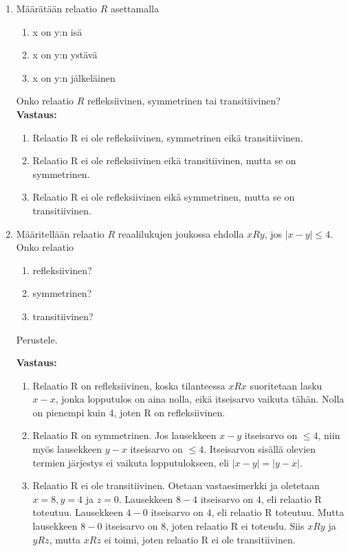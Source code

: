 \documentclass[a4paper,12pt]{article}
\begin{document}
 

\otsikko

\begin{enumerate}
\item Määrätään relaatio $R$ asettamalla 
\begin{enumerate}
    \item x on y:n isä
    \item x on y:n ystävä
    \item x on y:n jälkeläinen
\end{enumerate}
Onko relaatio $R$ refleksiivinen, symmetrinen tai transitiivinen? \\

\textbf{Vastaus:} 
\begin{enumerate}
    \item Relaatio R ei ole refleksiivinen, symmetrinen eikä transitiivinen. 
    \item Relaatio R ei ole refleksiivinen eikä transitiivinen, mutta se on symmetrinen.
    \item Relaatio R ei ole refleksiivinen eikä symmetrinen, mutta se on transitiivinen. 
\end{enumerate}
\vspace{1em}

\item M\"a\"aritell\"a\"an relaatio $R$ reaalilukujen joukossa ehdolla $xRy$, jos $|x-y|\leq 4$. Onko relaatio
\begin{enumerate}
    \item refleksiivinen?
    \item symmetrinen?
    \item transitiivinen?
\end{enumerate}
Perustele.

\textbf{Vastaus:}

\begin{enumerate}
    \item Relaatio R on refleksiivinen, koska tilanteessa $xRx$ suoritetaan lasku $x-x$, jonka lopputulos on aina nolla, eikä itseisarvo vaikuta tähän. Nolla on pienempi kuin 4, joten R on refleksiivinen. 
    \item Relaatio R on symmetrinen. Jos lausekkeen $x-y$ itseisarvo on $\leq4$, niin myös lausekkeen $y-x$ itseisarvo on $\leq 4$. Itseisarvon sisällä olevien termien järjestys ei vaikuta lopputulokseen, eli $|x-y|=|y-x|$. 
    \item Relaatio R ei ole transitiivinen. Otetaan vastaesimerkki ja oletetaan $x=8, y=4$ ja $z=0$. Lausekkeen $8-4$ itseisarvo on $4$, eli relaatio R toteutuu. Lausekkeen $4-0$ itseisarvo on $4$, eli relaatio R toteutuu. Mutta lausekkeen $8-0$ itseisarvo on 8, joten relaatio R ei toteudu. Siis $xRy$ ja $yRz$, mutta $xRz$ ei toimi, joten relaatio R ei ole transitiivinen. 
\end{enumerate}
\vspace{1em}
 

\end{enumerate}
\end{document}
